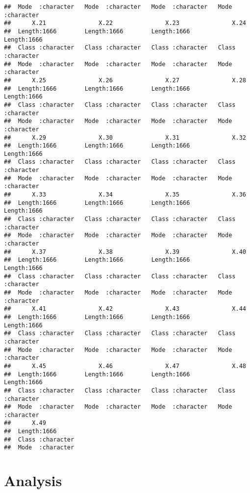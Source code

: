 \documentclass[
]{article}
\begin{document}
\begin{verbatim}
##  Mode  :character   Mode  :character   Mode  :character   Mode  :character  
##      X.21               X.22               X.23               X.24          
##  Length:1666        Length:1666        Length:1666        Length:1666       
##  Class :character   Class :character   Class :character   Class :character  
##  Mode  :character   Mode  :character   Mode  :character   Mode  :character  
##      X.25               X.26               X.27               X.28          
##  Length:1666        Length:1666        Length:1666        Length:1666       
##  Class :character   Class :character   Class :character   Class :character  
##  Mode  :character   Mode  :character   Mode  :character   Mode  :character  
##      X.29               X.30               X.31               X.32          
##  Length:1666        Length:1666        Length:1666        Length:1666       
##  Class :character   Class :character   Class :character   Class :character  
##  Mode  :character   Mode  :character   Mode  :character   Mode  :character  
##      X.33               X.34               X.35               X.36          
##  Length:1666        Length:1666        Length:1666        Length:1666       
##  Class :character   Class :character   Class :character   Class :character  
##  Mode  :character   Mode  :character   Mode  :character   Mode  :character  
##      X.37               X.38               X.39               X.40          
##  Length:1666        Length:1666        Length:1666        Length:1666       
##  Class :character   Class :character   Class :character   Class :character  
##  Mode  :character   Mode  :character   Mode  :character   Mode  :character  
##      X.41               X.42               X.43               X.44          
##  Length:1666        Length:1666        Length:1666        Length:1666       
##  Class :character   Class :character   Class :character   Class :character  
##  Mode  :character   Mode  :character   Mode  :character   Mode  :character  
##      X.45               X.46               X.47               X.48          
##  Length:1666        Length:1666        Length:1666        Length:1666       
##  Class :character   Class :character   Class :character   Class :character  
##  Mode  :character   Mode  :character   Mode  :character   Mode  :character  
##      X.49          
##  Length:1666       
##  Class :character  
##  Mode  :character
\end{verbatim}

\newpage

\hypertarget{analysis}{%
\section{Analysis}\label{analysis}}
\end{document}
